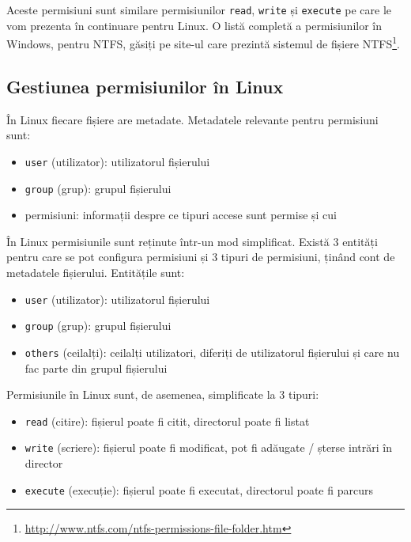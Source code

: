 Aceste permisiuni sunt similare permisiunilor \texttt{read}, \texttt{write} și \texttt{execute} pe care le
vom prezenta în continuare pentru Linux. O listă completă a permisiunilor în
Windows, pentru NTFS, găsiți pe site-ul care prezintă sistemul de fișiere NTFS\footnote{\url{http://www.ntfs.com/ntfs-permissions-file-folder.htm}}.

\subsection{Gestiunea permisiunilor în Linux}
\label{sec:user:linux-perm}

În Linux fiecare fișiere are metadate. Metadatele relevante pentru permisiuni sunt:

\begin{itemize}
  \item \texttt{user} (utilizator): utilizatorul fișierului
  \item \texttt{group} (grup): grupul fișierului
  \item permisiuni: informații despre ce tipuri accese sunt permise și cui
\end{itemize}

În Linux permisiunile sunt reținute într-un mod simplificat. Există 3 entități
pentru care se pot configura permisiuni și 3 tipuri de permisiuni, ținând cont
de metadatele fișierului. Entitățile sunt:

\begin{itemize}
  \item \texttt{user} (utilizator): utilizatorul fișierului
  \item \texttt{group} (grup): grupul fișierului
  \item \texttt{others} (ceilalți): ceilalți utilizatori, diferiți de utilizatorul
    fișierului și care nu fac parte din grupul fișierului
\end{itemize}

Permisiunile în Linux sunt, de asemenea, simplificate la 3 tipuri:

\begin{itemize}
  \item \texttt{read} (citire): fișierul poate fi citit, directorul poate fi listat
  \item \texttt{write} (scriere): fișierul poate fi modificat, pot fi adăugate /
    șterse intrări în director
  \item \texttt{execute} (execuție): fișierul poate fi executat, directorul poate
    fi parcurs
\end{itemize}

